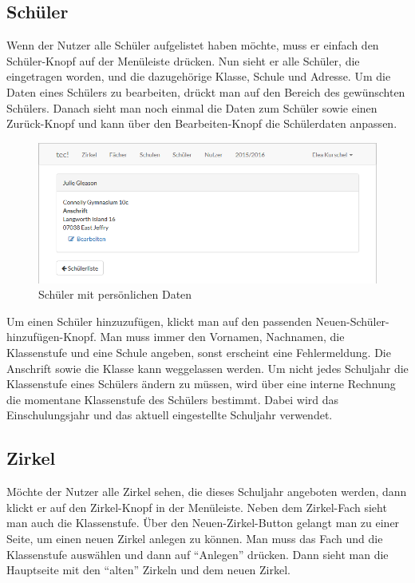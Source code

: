 \subsection{Schüler}
Wenn der Nutzer alle Schüler aufgelistet haben möchte, muss er einfach den Schüler-Knopf auf der Menüleiste drücken. Nun sieht er alle Schüler, die eingetragen worden, und die dazugehörige Klasse, Schule und Adresse. Um die Daten eines Schülers zu bearbeiten, drückt man auf den Bereich des gewünschten Schülers. Danach sieht man noch einmal die Daten zum Schüler sowie einen Zurück-Knopf und kann über den Bearbeiten-Knopf die Schülerdaten anpassen.

\begin{figure}[h]
	\centering
	\includegraphics[scale=.5]{bilder/Schueler_Daten.png}
	\caption{Schüler mit persönlichen Daten}
\end{figure}

Um einen Schüler hinzuzufügen, klickt man auf den passenden Neuen-Schüler-hinzufügen-Knopf. Man muss immer den Vornamen, Nachnamen, die Klassenstufe und eine Schule angeben, sonst erscheint eine Fehlermeldung. Die Anschrift sowie die Klasse kann weggelassen werden. Um nicht jedes Schuljahr die Klassenstufe eines Schülers ändern zu müssen, wird über eine interne Rechnung die momentane Klassenstufe des Schülers bestimmt. Dabei wird das Einschulungsjahr und das aktuell eingestellte Schuljahr verwendet.

\newpage \subsection{Zirkel}
Möchte der Nutzer alle Zirkel sehen, die dieses Schuljahr angeboten werden, dann klickt er auf den Zirkel-Knopf in der Menüleiste. Neben dem Zirkel-Fach sieht man auch die Klassenstufe. Über den Neuen-Zirkel-Button gelangt man zu einer Seite, um einen neuen Zirkel anlegen zu können. Man muss das Fach und die Klassenstufe auswählen und dann auf "`Anlegen"' drücken. Dann sieht man die Hauptseite mit den "`alten"' Zirkeln und dem neuen Zirkel. 

